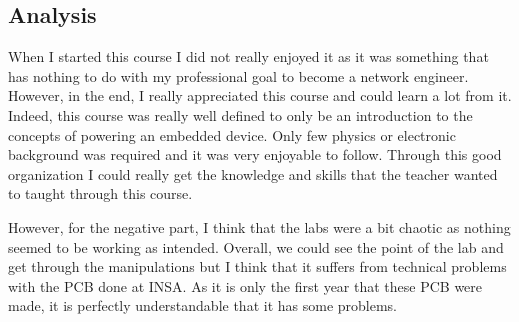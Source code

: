 \subsection{Analysis}

When I started this course I did not really enjoyed it as it was something that has nothing to do with my professional goal to become a network engineer. However, in the end, I really appreciated this course and could learn a lot from it. Indeed, this course was really well defined to only be an introduction to the concepts of powering an embedded device. Only few physics or electronic background was required and it was very enjoyable to follow. Through this good organization I could really get the knowledge and skills that the teacher wanted to taught through this course.
\\\par

However, for the negative part, I think that the labs were a bit chaotic as nothing seemed to be working as intended. Overall, we could see the point of the lab and get through the manipulations but I think that it suffers from technical problems with the PCB done at INSA. As it is only the first year that these PCB were made, it is perfectly understandable that it has some problems. 